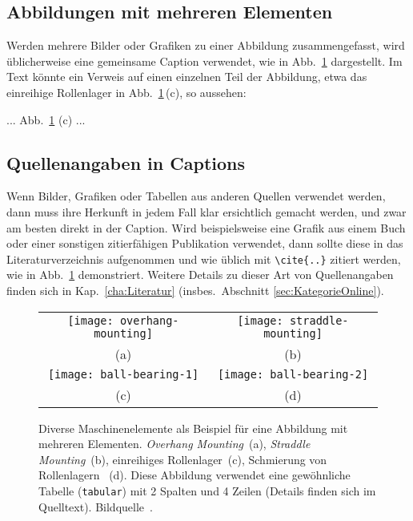 \subsection{Abbildungen mit mehreren Elementen}

Werden mehrere Bilder oder Grafiken zu einer Abbildung zusammengefasst, wird
üblicherweise eine gemeinsame Caption verwendet, wie in Abb.~\ref{fig:Bearings}
dargestellt. Im Text könnte ein Verweis auf einen einzelnen Teil der
Abbildung, etwa das einreihige Rollenlager in Abb.~\ref{fig:Bearings}\,(c),
so aussehen:
%
\begin{LaTeXCode}[numbers=none]
... Abb.~\ref{fig:Bearings} (c) ... 
\end{LaTeXCode}


\subsection{Quellenangaben in Captions}
\label{sec:QuellenangabenInCaptions}

Wenn Bilder, Grafiken oder Tabellen aus anderen Quellen verwendet werden,
dann muss ihre Herkunft in jedem Fall klar ersichtlich gemacht werden, und
zwar am besten direkt in der Caption. Wird beispielsweise eine Grafik aus
einem Buch oder einer sonstigen zitierfähigen Publikation verwendet, dann
sollte diese in das Literaturverzeichnis aufgenommen und wie üblich mit
\verb!\cite{..}! zitiert werden, wie in Abb.\ \ref{fig:Bearings} demonstriert.
Weitere Details zu dieser Art von Quellenangaben finden sich in Kap.\
\ref{cha:Literatur} (insbes.\ Abschnitt \ref{sec:KategorieOnline}).

\begin{figure}
	\centering\small
	\begin{tabular}{@{}c@{\hspace{12mm}}c@{}} %
		\texttt{[image: overhang-mounting]} &
		\texttt{[image: straddle-mounting]}
		\\
		(a) & (b)
		\\[4pt]    %
		\texttt{[image: ball-bearing-1]} &
		\texttt{[image: ball-bearing-2]}
		\\
		(c) & (d)
	\end{tabular}
%
	\caption{Diverse Maschinenelemente als Beispiel für eine Abbildung mit
	mehreren Elementen. \emph{Overhang Mounting}~(a), \emph{Straddle
	Mounting}~(b), einreihiges Rollenlager~(c), Schmierung von Rollenlagern~
	(d). Diese Abbildung verwendet eine gewöhnliche Tabelle
	(\texttt{tabular}) mit 2 Spalten und 4 Zeilen (Details finden sich im
	Quelltext). Bildquelle~\cite{Faires1934}.}
	\label{fig:Bearings}
\end{figure}


